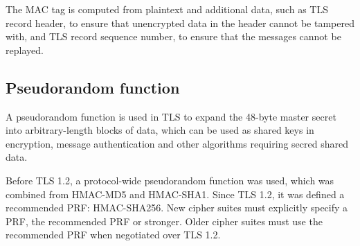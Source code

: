 The MAC tag is computed from plaintext and additional data, such as TLS record header, to ensure that unencrypted data in the header cannot be tampered with, and TLS record sequence number, to ensure that the messages cannot be replayed.

\subsection{Pseudorandom function}

A pseudorandom function is used in TLS to expand the 48-byte master secret into arbitrary-length blocks of data, which can be used as shared keys in encryption, message authentication and other algorithms requiring secred shared data.

Before TLS 1.2, a protocol-wide pseudorandom function was used, which was combined from HMAC-MD5 and HMAC-SHA1. Since TLS 1.2, it was defined a recommended PRF: HMAC-SHA256. New cipher suites must explicitly specify a PRF, the recommended PRF or stronger. Older cipher suites must use the recommended PRF when negotiated over TLS 1.2.
